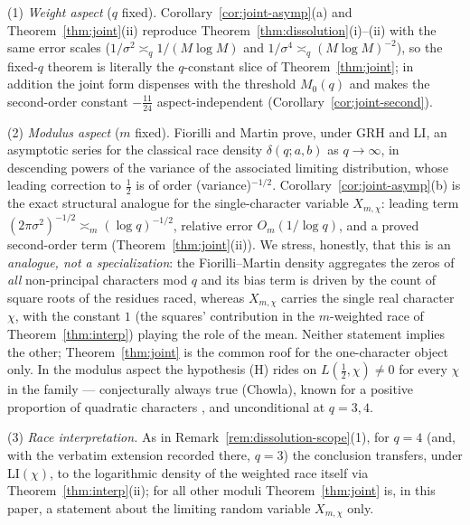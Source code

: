 \begin{remark}
\label{rem:joint-fm}
(1) \emph{Weight aspect} ($q$ fixed). Corollary~\ref{cor:joint-asymp}(a)
and Theorem~\ref{thm:joint}(ii) reproduce
Theorem~\ref{thm:dissolution}(i)--(ii) with the same error scales
($1/\sigma^2\asymp_q1/(M\log M)$ and
$1/\sigma^4\asymp_q(M\log M)^{-2}$), so the fixed-$q$ theorem is
literally the $q$-constant slice of Theorem~\ref{thm:joint}; in
addition the joint form dispenses with the threshold $M_0(q)$ and
makes the second-order constant $-\tfrac{11}{24}$ aspect-independent
(Corollary~\ref{cor:joint-second}).

(2) \emph{Modulus aspect} ($m$ fixed). Fiorilli and Martin \cite{FM13}
prove, under GRH and LI, an asymptotic series for the classical race
density $\delta(q;a,b)$ as $q\to\infty$, in descending powers of the
variance of the associated limiting distribution, whose leading
correction to $\tfrac12$ is of order (variance)$^{-1/2}$.
Corollary~\ref{cor:joint-asymp}(b) is the exact structural analogue
for the single-character variable $X_{m,\chi}$: leading term
$(2\pi\sigma^2)^{-1/2}\asymp_m(\log q)^{-1/2}$, relative error
$O_m(1/\log q)$, and a proved second-order term
(Theorem~\ref{thm:joint}(ii)). We stress, honestly, that this is an
\emph{analogue, not a specialization}: the Fiorilli--Martin density
aggregates the zeros of \emph{all} non-principal characters mod $q$
and its bias term is driven by the count of square roots of the
residues raced, whereas $X_{m,\chi}$ carries the single real character
$\chi$, with the constant $1$ (the squares' contribution in the
$m$-weighted race of Theorem~\ref{thm:interp}) playing the role of the
mean. Neither statement implies the other; Theorem~\ref{thm:joint} is
the common roof for the one-character object only. In the modulus
aspect the hypothesis (H) rides on $L(\tfrac12,\chi)\ne0$ for every
$\chi$ in the family --- conjecturally always true (Chowla), known for
a positive proportion of quadratic characters \cite{Sou00}, and
unconditional at $q=3,4$.

(3) \emph{Race interpretation.} As in
Remark~\ref{rem:dissolution-scope}(1), for $q=4$ (and, with the
verbatim extension recorded there, $q=3$) the conclusion transfers,
under LI$(\chi)$, to the logarithmic density of the weighted race
itself via Theorem~\ref{thm:interp}(ii); for all other moduli
Theorem~\ref{thm:joint} is, in this paper, a statement about the
limiting random variable $X_{m,\chi}$ only.
\end{remark}

